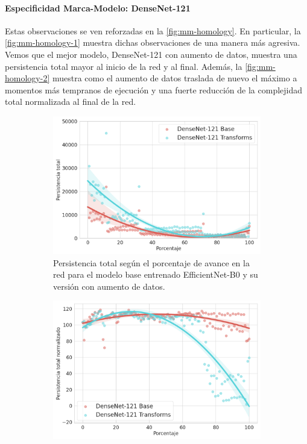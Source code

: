 \paragraph{Especificidad Marca-Modelo: DenseNet-121}

Estas observaciones se ven reforzadas en la \autoref{fig:mm-homology}. En particular, la \autoref{fig:mm-homology-1} muestra dichas observaciones de una manera más agresiva. Vemos que el mejor modelo, DenseNet-121 con aumento de datos, muestra una persistencia total mayor al inicio de la red y al final. Además, la \autoref{fig:mm-homology-2} muestra como el aumento de datos traslada de nuevo el máximo a momentos más tempranos de ejecución y una fuerte reducción de la complejidad total normalizada al final de la red.

\begin{figure}[H]
	\centering
	\begin{subfigure}{.5\textwidth}
		\centering
		\includegraphics[width=\linewidth]{img/mm.png}
		\caption{Persistencia total según el porcentaje de avance en la red para el modelo base entrenado EfficientNet-B0 y su versión con aumento de datos.}
		\label{fig:mm-homology-1}
	\end{subfigure}%
	\begin{subfigure}{.5\textwidth}
		\centering
		\includegraphics[width=\linewidth]{img/mm_norm.png}

\end{subfigure}
\end{figure}
